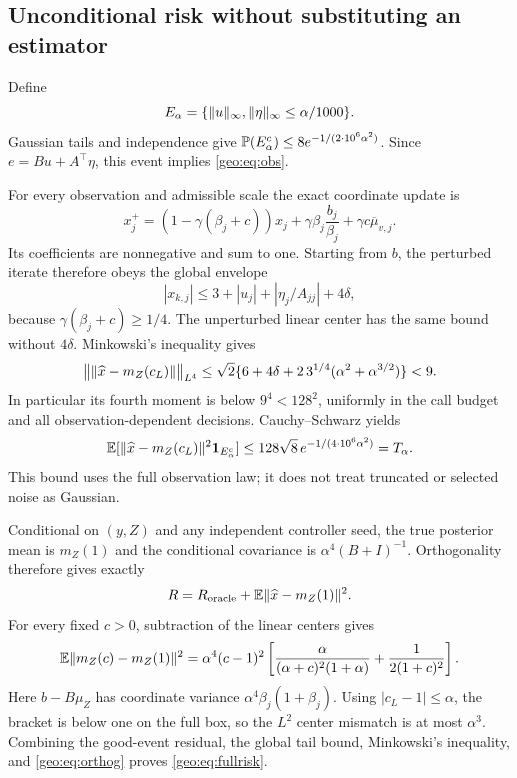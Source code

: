 \subsection{Unconditional risk without substituting an estimator}
Define
\[
 E_\alpha=\{\lVert u\rVert_\infty,\lVert\eta\rVert_\infty\le\alpha/1000\}.
\]
Gaussian tails and independence give
$\mathbb P(E_\alpha^c)\le8e^{-1/(2\cdot10^6\alpha^2)}$.
Since $e=Bu+A^\top\eta$, this event implies \eqref{geo:eq:obs}.

For every observation and admissible scale the exact coordinate update is
\[
 x_j^+=(1-\gamma(\beta_j+c))x_j
 +\gamma\beta_j\frac{b_j}{\beta_j}+\gamma c\overline\mu_{v,j}.
\]
Its coefficients are nonnegative and sum to one. Starting from $b$, the
perturbed iterate therefore obeys the global envelope
\begin{equation}\label{geo:eq:envelope}
 |x_{k,j}|\le3+|u_j|+|\eta_j/A_{jj}|+4\delta,
\end{equation}
because $\gamma(\beta_j+c)\ge1/4$. The unperturbed linear center has the same
bound without $4\delta$. Minkowski's inequality gives
\[
 \big\|\lVert\widehat x-m_Z(c_L)\rVert\big\|_{L^4}
 \le\sqrt2\{6+4\delta+2\,3^{1/4}(\alpha^2+\alpha^{3/2})\}<9.
\]
In particular its fourth moment is below $9^4<128^2$, uniformly in the call
budget and all observation-dependent decisions. Cauchy--Schwarz yields
\[
 \mathbb E[\lVert\widehat x-m_Z(c_L)\rVert^2\mathbf1_{E_\alpha^c}]
 \le128\sqrt8\,e^{-1/(4\cdot10^6\alpha^2)}=T_\alpha.
\]
This bound uses the full observation law; it does not treat truncated or
selected noise as Gaussian.

Conditional on $(y,Z)$ and any independent controller seed, the true posterior
mean is $m_Z(1)$ and the conditional covariance is
$\alpha^4(B+I)^{-1}$. Orthogonality therefore gives exactly
\begin{equation}\label{geo:eq:orthog}
 R=R_{\rm oracle}+\mathbb E\lVert\widehat x-m_Z(1)\rVert^2.
\end{equation}
For every fixed $c>0$, subtraction of the linear centers gives
\begin{equation}\label{geo:eq:mismatch}
 \mathbb E\lVert m_Z(c)-m_Z(1)\rVert^2
 =\alpha^4(c-1)^2\left[
 \frac{\alpha}{(\alpha+c)^2(1+\alpha)}+
 \frac1{2(1+c)^2}\right].
\end{equation}
Here $b-B\mu_Z$ has coordinate variance $\alpha^4\beta_j(1+\beta_j)$.
Using $|c_L-1|\le\alpha$, the bracket is below one on the full box, so the
$L^2$ center mismatch is at most $\alpha^3$. Combining the good-event
residual, the global tail bound, Minkowski's inequality, and \eqref{geo:eq:orthog}
proves \eqref{geo:eq:fullrisk}.

